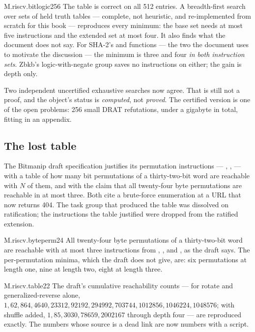 \begin{artifact}{M.riscv.bitlogic256}
The table is correct on all 512 entries. A breadth-first search over sets of held truth tables --- complete, not heuristic, and re-implemented from scratch for this book --- reproduces every minimum: the base set needs at most five instructions and the extended set at most four. It also finds what the document does not say. For SHA-2's  and  functions --- the two the document uses to motivate the discussion --- the minimum is three and four \emph{in both instruction sets}. Zbkb's logic-with-negate group saves no instructions on either; the gain is depth only.

Two independent uncertified exhaustive searches now agree. That is still not a proof, and the object's status is \emph{computed}, not \emph{proved}. The certified version is one of the open problems: 256 small DRAT refutations, under a gigabyte in total, fitting in an appendix.
\end{artifact}

\subsection{The lost table}

The Bitmanip draft specification justifies its permutation instructions --- , ,  --- with a table of how many bit permutations of a thirty-two-bit word are reachable with \(N\) of them, and with the claim that all twenty-four byte permutations are reachable in at most three. Both cite a brute-force enumeration at a URL that now returns 404. The task group that produced the table was dissolved on ratification; the instructions the table justified were dropped from the ratified extension.

\begin{artifact}{M.riscv.byteperm24}
All twenty-four byte permutations of a thirty-two-bit word are reachable with at most three instructions from , ,  and , as the draft says. The per-permutation minima, which the draft does not give, are: six permutations at length one, nine at length two, eight at length three.
\end{artifact}

\begin{artifact}{M.riscv.table22}
The draft's cumulative reachability counts --- for rotate and generalized-reverse alone, \(1, 62, 864, 4640, 23312, 92192, 294992, 703744, 1012856, 1046224, 1048576\); with shuffle added, \(1, 85, 3030, 78659, 2002167\) through depth four --- are reproduced exactly. The numbers whose source is a dead link are now numbers with a script.
\end{artifact}

